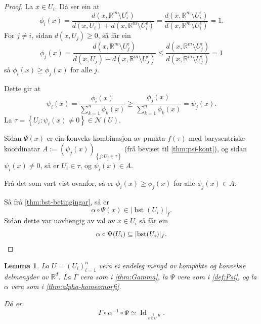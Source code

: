 \documentclass[a4paper, 12pt, norsk]{article}
\theoremstyle{plain}
\newtheorem{lemma}[theorem]{Lemma}
\theoremstyle{definition}
\newcommand{\Rb}{\mathbb{R}}
\newcommand{\Nc}{\mathcal{N}}
\newcommand{\union}{ \mathop{\cup}\limits }
\newcommand{\gr}[1]{ \lvert #1 \rvert } %
\newcommand{\set}[1]{ \left\{ #1 \right\} } %
\newcommand{\tuple}[1]{ \left( #1 \right) } %
\DeclareMathOperator{\bst}{bst} %
\DeclareMathOperator{\Id}{Id} %
\begin{document}
\begin{proof}
	La \( x \in U_i \). Då ser ein at
	\[
		\phi_i(x) = \frac{d(x, \Rb^m \setminus U_i^\epsilon)}{d(x, U_i) + d(x, \Rb^m \setminus U_i^\epsilon)} = \frac{d(x, \Rb^m \setminus U_i^\epsilon)}{d(x, \Rb^m \setminus U_i^\epsilon)} = 1.
	\] 
	For \( j \neq i \), sidan \( d(x, U_j) \geq 0 \), så får ein
	\[
		\phi_j(x) = \frac{d(x, \Rb^m \setminus U_j^\epsilon)}{d(x, U_j) + d(x, \Rb^m \setminus U_j^\epsilon)} \leq \frac{d(x, \Rb^m \setminus U_j^\epsilon)}{d(x, \Rb^m \setminus U_j^\epsilon)} = 1
	\]
	så \( \phi_i(x) \geq \phi_j(x) \) for alle \( j \).

	Dette gir at
	\[
		\psi_i(x) = \frac{\phi_i(x)}{\sum_{k=1}^n \phi_k(x)} \geq \frac{\phi_j(x)}{\sum_{k=1}^n \phi_k(x)} = \psi_j(x).
	\]
	La \( \tau = \set{U_i : \psi_i(x) \neq 0} \in \Nc(U) \).

	Sidan \( \Psi(x) \) er ein konveks kombinasjon av punkta \( f(\tau) \) med barysentriske koordinatar \( A:= \tuple{\psi_j(x)}_{\set{ j : U_j\in \tau}} \) (frå beviset til \autoref{thm:psi-kont}), og sidan \( \psi_i(x) \neq 0 \), så er \( U_i \in \tau \), og \( \psi_i(x) \in A \).
	
	Frå det som vart vist ovanfor, så er \( \phi_i(x) \geq \phi_j(x) \) for alle \( \phi_j(x) \in A \).
	
	Så frå \autoref{thm:bst-betingingar}, så er
	\[
		\alpha \circ \Psi(x) \in \gr{\bst(U_i)}_f.
	\]
	Sidan dette var uavhengig av val av \( x \in U_i \) så får ein
	\[
		\alpha \circ \Psi(U_i) \subseteq \gr{\bst(U_i)}_f. \qedhere
	\]
\end{proof}

\begin{lemma} \label{thm:homeq-u}
	La \( U = \tuple{U_i}_{i=1}^n \) vera ei endeleg mengd av kompakte og konvekse delmengder av \( \Rb^d \). La \( \Gamma \) vera som i \autoref{thm:Gamma}, la \( \Psi \) vera som i \autoref{def:Psi}, og la \( \alpha \) vera som i \autoref{thm:alpha-homeomorfi}. 
	
	Då er
	\[
		\Gamma \circ \alpha^{-1} \circ \Psi \simeq \Id_{\union_{u \in U} u}.
	\]
\end{lemma}
\end{document}
